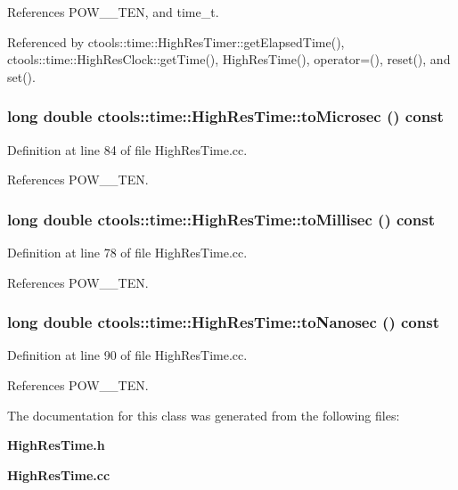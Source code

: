 References POW\_\_\-TEN, and time\_\-t.

Referenced by ctools::time::High\-Res\-Timer::get\-Elapsed\-Time(), ctools::time::High\-Res\-Clock::get\-Time(), High\-Res\-Time(), operator=(), reset(), and set().
\subsubsection{\setlength{\rightskip}{0pt plus 5cm}long double ctools::time::High\-Res\-Time::to\-Microsec () const}\label{classctools_1_1time_1_1HighResTime_a12}




Definition at line 84 of file High\-Res\-Time.cc.

References POW\_\_\-TEN.
\subsubsection{\setlength{\rightskip}{0pt plus 5cm}long double ctools::time::High\-Res\-Time::to\-Millisec () const}\label{classctools_1_1time_1_1HighResTime_a11}




Definition at line 78 of file High\-Res\-Time.cc.

References POW\_\_\-TEN.
\subsubsection{\setlength{\rightskip}{0pt plus 5cm}long double ctools::time::High\-Res\-Time::to\-Nanosec () const}\label{classctools_1_1time_1_1HighResTime_a13}




Definition at line 90 of file High\-Res\-Time.cc.

References POW\_\_\-TEN.

The documentation for this class was generated from the following files:\begin{CompactItemize}
\item 
{\bf High\-Res\-Time.h}\item 
{\bf High\-Res\-Time.cc}\end{CompactItemize}
